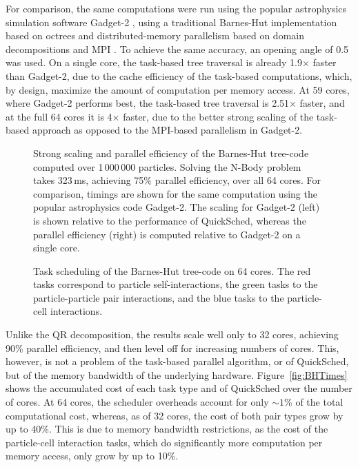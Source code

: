 \documentclass[fleqn,10pt]{wlpeerj}
\newcommand{\fig}[1]
    {Figure~\ref{fig:#1}}
\begin{document}
For comparison, the same computations were run using the popular
astrophysics simulation software Gadget-2 \citep{ref:Springel2005},
using a traditional Barnes-Hut implementation based on octrees
and distributed-memory parallelism based on domain decompositions
and MPI \citep{ref:Snir1998}.
To achieve the same accuracy, an opening angle of 0.5 was used.
On a single core, the task-based tree traversal is already 1.9$\times$
faster than Gadget-2, due to the cache efficiency of the task-based
computations, which, by design, maximize the amount of computation
per memory access.
At 59 cores, where Gadget-2 performs best, the task-based tree traversal is
2.51$\times$ faster, and at the full 64 cores it is 4$\times$ faster,
due to the better strong scaling of the task-based approach as opposed
to the MPI-based parallelism in Gadget-2.

\begin{figure}
    \centerline{}
    \caption{Strong scaling and parallel efficiency of the Barnes-Hut tree-code
        computed over 1\,000\,000 particles.
        Solving the N-Body problem takes 323\,ms, achieving 75\% parallel
        efficiency, over all 64 cores.
        For comparison, timings are shown for the same computation using
        the popular astrophysics code Gadget-2.
        The scaling for Gadget-2 (left) is shown relative to the performance of
        QuickSched, whereas the parallel efficiency (right) is computed relative
        to Gadget-2 on a single core.
        }
    \label{fig:BHResults}
\end{figure}

\begin{figure}
    \centerline{}
    \caption{Task scheduling of the Barnes-Hut tree-code on 64 cores.
      The red tasks correspond to particle self-interactions, the green
      tasks to the particle-particle pair interactions, and the blue
      tasks to the particle-cell interactions.}
    \label{fig:BHTasksPlot}
\end{figure}

Unlike the QR decomposition, the results scale well only to
32 cores, achieving 90\% parallel efficiency, and then
level off for increasing numbers of cores.
This, however, is not a problem of the task-based parallel
algorithm, or of QuickSched, but of the memory bandwidth
of the underlying hardware.
\fig{BHTimes} shows the accumulated cost of each task type and of 
QuickSched over the number of cores.
At 64 cores, the scheduler overheads account for only $\sim 1$\% of
the total computational cost, whereas,
as of 32 cores, the cost of both pair types grow by up to
40\%.
This is due to memory bandwidth restrictions, as
the cost of the particle-cell interaction tasks, which do significantly more
computation per memory access, only grow by up to 10\%.
\end{document}
